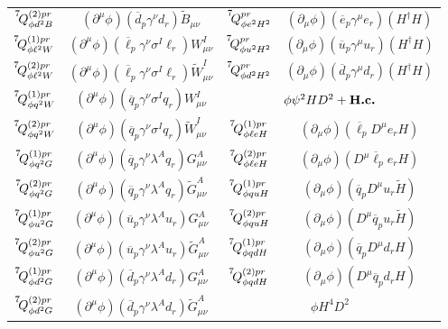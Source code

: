 \begin{table}[htbp]
\begin{tabular}{ c|c||c|c }
\\
$\op{7}{\phi d^2 B}{(2)pr}$ & $(\partial^\mu \phi)(\overline d_p \gamma^\nu d_r)\widetilde B_{\mu\nu}$  & $\op{7}{\phi e^2 H^2}{pr}$ & $(\partial_\mu \phi)(\overline e_p \gamma^\mu e_r)(H^\dagger H)$
\\
$\op{7}{\phi \ell^2 W}{(1)pr}$ & $(\partial^\mu \phi)(\overline \ell_p \gamma^\nu \sigma^I \ell_r)W^I_{\mu\nu}$ & $\op{7}{\phi u^2 H^2}{pr}$ & $(\partial_\mu \phi)(\overline u_p \gamma^\mu u_r)(H^\dagger H)$
\\
$\op{7}{\phi \ell^2 W}{(2)pr}$ & $(\partial^\mu \phi)(\overline \ell_p \gamma^\nu \sigma^I \ell_r)\widetilde W^I_{\mu\nu}$ & $\op{7}{\phi d^2 H^2}{pr}$ & $(\partial_\mu \phi)(\overline d_p \gamma^\mu d_r)(H^\dagger H)$
\\ \hhline{~|~||--}
$\op{7}{\phi q^2 W}{(1)pr}$ & $(\partial^\mu \phi)(\overline q_p \gamma^\nu \sigma^I q_r)W^I_{\mu\nu}$ & \multicolumn{2}{c}{\cellcolor{hdrcolor}\hyperref[par:phipsi2HD2]{\boldmath$\phi \psi^2 H D^2 + \text{\bf H.c.}$}} 
\\ \hhline{~|~||--}
$\op{7}{\phi q^2 W}{(2)pr}$ & $(\partial^\mu \phi)(\overline q_p \gamma^\nu \sigma^I q_r) \widetilde W^I_{\mu\nu}$ & $\op{7}{\phi \ell e H}{(1)pr}$ & $(\partial_\mu \phi)(\overline \ell_p D^\mu e_r H)$
\\
$\op{7}{\phi q^2 G}{(1)pr}$ & $(\partial^\mu \phi)(\overline q_p \gamma^\nu \lambda^A q_r)G^A_{\mu\nu}$ & $\op{7}{\phi \ell e H}{(2)pr}$ & $(\partial_\mu \phi)(D^\mu \overline \ell_p e_r H)$ 
\\
$\op{7}{\phi q^2 G}{(2)pr}$ & $(\partial^\mu \phi)(\overline q_p \gamma^\nu \lambda^A q_r) \widetilde G^A_{\mu\nu}$ & $\op{7}{\phi qu H}{(1)pr}$ & $(\partial_\mu \phi)(\overline q_p D^\mu u_r \widetilde H)$ 
\\
$\op{7}{\phi u^2 G}{(1)pr}$ & $(\partial^\mu \phi)(\overline u_p \gamma^\nu \lambda^A u_r)G^A_{\mu\nu}$ & $\op{7}{\phi qu H}{(2)pr}$ & $(\partial_\mu \phi)(D^\mu \overline q_p u_r \widetilde H)$ 
\\
$\op{7}{\phi u^2 G}{(2)pr}$ & $(\partial^\mu \phi)(\overline u_p \gamma^\nu \lambda^A u_r)\widetilde G^A_{\mu\nu}$ & $\op{7}{\phi qd H}{(1)pr}$ & $(\partial_\mu \phi)(\overline q_p D^\mu d_r  H)$
\\
$\op{7}{\phi d^2 G}{(1)pr}$ & $(\partial^\mu \phi)(\overline d_p \gamma^\nu \lambda^A d_r)G^A_{\mu\nu}$ & $\op{7}{\phi qd H}{(2)pr}$ & $(\partial_\mu \phi)(D^\mu \overline q_p d_r H)$ 
\\ \hhline{~|~||--}
$\op{7}{\phi d^2 G}{(2)pr}$ & $(\partial^\mu \phi)(\overline d_p \gamma^\nu \lambda^A d_r)\widetilde G^A_{\mu\nu}$ & \multicolumn{2}{c}{\cellcolor{hdrcolor}\hyperref[par:phiH4D2]{\boldmath$\phi H^4 D^2$}} 

\end{tabular}
\end{table}
